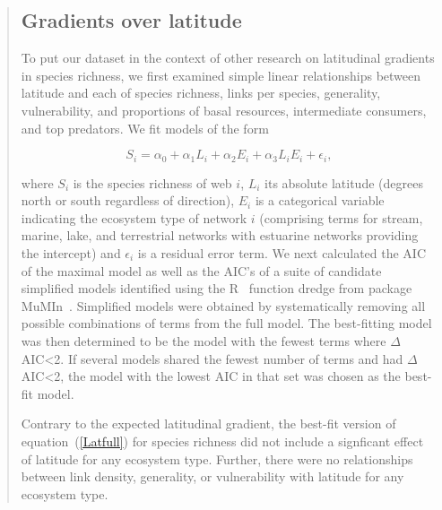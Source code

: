 \documentclass[12pt]{letter}
\begin{document}
  \begin{quotation}

    \subsection*{Gradients over latitude}

    To put our dataset in the context of other research on latitudinal gradients in species richness,
    we first examined simple linear relationships between latitude and each of 
    species richness, links per species, generality, vulnerability, and proportions
    of basal resources, intermediate consumers, and top predators. We fit models of the form

    \begin{equation}
    \label{Latfull}
    S_{i} = \alpha_{0} + \alpha_{1} L_{i} + \alpha_{2} E_{i} + \alpha_{3} L_{i} E_{i} + \epsilon_{i} ,
    \end{equation}

    \noindent where $S_{i}$ is the species richness of web $i$, $L_{i}$ its absolute
    latitude (degrees north or south  regardless of direction), $E_{i}$ is a categorical
    variable indicating the ecosystem type of network $i$ (comprising terms for stream, 
    marine, lake, and terrestrial networks with estuarine
    networks providing the intercept) and $\epsilon_{i}$ is a residual error term. 
    We next calculated the AIC
    of the maximal model as well as the AIC's of a suite of candidate simplified models identified
    using the R~\citep{R} function dredge from package MuMIn~\citep{MuMIn}. 
    Simplified models were obtained by
    systematically removing all possible combinations of terms from the full model.
    The best-fitting model was then determined to be the model with the fewest terms 
    where $\Delta$AIC\textless2. If several models shared the fewest number of terms 
    and had $\Delta$AIC\textless2, the model with the lowest AIC in that set was chosen as the best-fit
    model.


    \smallskip

    Contrary to the expected latitudinal gradient, the best-fit version of
    equation~(\ref{Latfull}) for species richness did not  include a signficant
    effect of latitude for any  ecosystem type. Further, there were no
    relationships between link density, generality, or vulnerability with
    latitude for any ecosystem type.

  \end{quotation}
\end{document}
